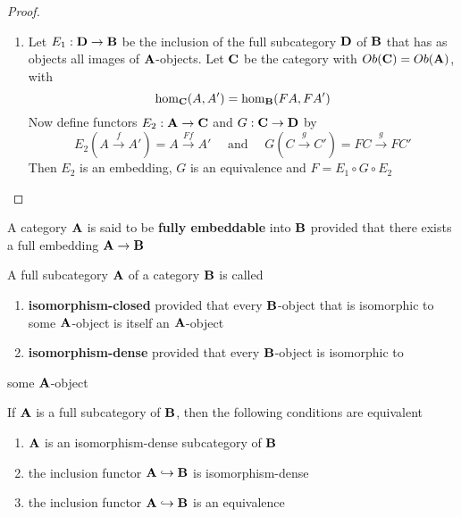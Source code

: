 \documentclass[11pt]{article}
\begin{document}
\begin{proof}
\begin{enumerate}
\item Let \(E_1:\operatorname{\textbf{D}}\to\operatorname{\textbf{B}}\) be the inclusion of the full subcategory \(\operatorname{\textbf{D}}\) of
\(\operatorname{\textbf{B}}\) that has as objects all images of \(\operatorname{\textbf{A}}\)-objects. Let \(\operatorname{\textbf{C}}\) be
the category with \(Ob(\operatorname{\textbf{C}})=Ob(\operatorname{\textbf{A}})\), with
\begin{equation*}
\operatorname{hom}_{\operatorname{\textbf{C}}}(A,A')=\operatorname{hom}_{\operatorname{\textbf{B}}}(FA,FA')
\end{equation*}
Now define functors \(E_2:\operatorname{\textbf{A}}\to\operatorname{\textbf{C}}\) and \(G:\operatorname{\textbf{C}}\to\operatorname{\textbf{D}}\) by
\begin{equation*}
E_2(A\xrightarrow{f}A')=A\xrightarrow{Ff}A' \quad\text{ and }\quad
G(C\xrightarrow{g}C')=FC\xrightarrow{g}FC'
\end{equation*}
Then \(E_2\) is an embedding, \(G\) is an equivalence and \(F=E_1\circ
      G\circ E_2\)
\end{enumerate}
\end{proof}

\begin{definition}[]
A category \(\operatorname{\textbf{A}}\) is said to be \textbf{fully embeddable} into \(\operatorname{\textbf{B}}\) provided that
there exists a full embedding \(\operatorname{\textbf{A}}\to\operatorname{\textbf{B}}\)
\end{definition}

\begin{definition}[]
A full subcategory \(\operatorname{\textbf{A}}\) of a category \(\operatorname{\textbf{B}}\) is called
\begin{enumerate}
\item \textbf{isomorphism-closed} provided that every \(\operatorname{\textbf{B}}\)-object that is isomorphic
to some \(\operatorname{\textbf{A}}\)-object is itself an \(\operatorname{\textbf{A}}\)-object
\item \textbf{isomorphism-dense} provided that every \(\operatorname{\textbf{B}}\)-object is isomorphic to
\end{enumerate}
some \(\operatorname{\textbf{A}}\)-object
\end{definition}

\begin{remark}
If \(\operatorname{\textbf{A}}\) is a full subcategory of \(\operatorname{\textbf{B}}\), then the following conditions
are equivalent
\begin{enumerate}
\item \(\operatorname{\textbf{A}}\) is an isomorphism-dense subcategory of \(\operatorname{\textbf{B}}\)
\item the inclusion functor \(\operatorname{\textbf{A}}\hookrightarrow\operatorname{\textbf{B}}\) is isomorphism-dense
\item the inclusion functor \(\operatorname{\textbf{A}}\hookrightarrow\operatorname{\textbf{B}}\) is an equivalence
\end{enumerate}
\end{remark}
\end{document}
